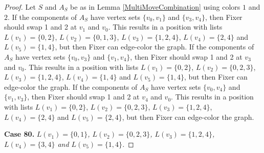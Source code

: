 \documentclass[12pt]{amsart}
\theoremstyle{plain}
\theoremstyle{definition}
\theoremstyle{remark}
\begin{document}
\begin{proof}
Let $S$ and $A_S$ be as in Lemma \ref{MultiMoveCombination} using colors $1$ and $2$. If the components of $A_S$ have vertex sets $\{v_0, v_1\}$ and $\{v_3, v_4\}$, then Fixer should swap 1 and 2 at $v_1$ and $v_0$. This results in a position with lists $L(v_1) = \{0, 2\}$, $L(v_2) = \{0, 1, 3\}$, $L(v_3) = \{1, 2, 4\}$, $L(v_4) = \{2, 4\}$ and $L(v_5) = \{1, 4\}$, but then Fixer can edge-color the graph.
If the components of $A_S$ have vertex sets $\{v_0, v_3\}$ and $\{v_1, v_4\}$, then Fixer should swap 1 and 2 at $v_3$ and $v_0$. This results in a position with lists $L(v_1) = \{0, 2\}$, $L(v_2) = \{0, 2, 3\}$, $L(v_3) = \{1, 2, 4\}$, $L(v_4) = \{1, 4\}$ and $L(v_5) = \{1, 4\}$, but then Fixer can edge-color the graph.
If the components of $A_S$ have vertex sets $\{v_0, v_4\}$ and $\{v_1, v_3\}$, then Fixer should swap 1 and 2 at $v_4$ and $v_0$. This results in a position with lists $L(v_1) = \{0, 2\}$, $L(v_2) = \{0, 2, 3\}$, $L(v_3) = \{1, 2, 4\}$, $L(v_4) = \{2, 4\}$ and $L(v_5) = \{2, 4\}$, but then Fixer can edge-color the graph.

\noindent\textbf{Case 80.  }\textit{$L(v_1) = \{0, 1\}$, $L(v_2) = \{0, 2, 3\}$, $L(v_3) = \{1, 2, 4\}$, $L(v_4) = \{3, 4\}$ and $L(v_5) = \{1, 4\}$.}


\end{proof}
\end{document}
